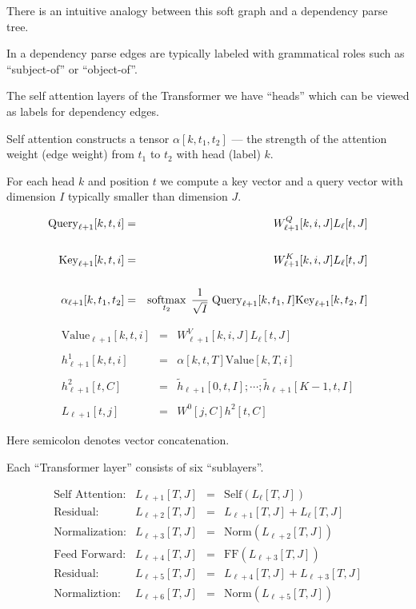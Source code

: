 {\vfill
There is an intuitive analogy between this soft graph and a dependency parse tree.


In a dependency parse edges are typically labeled with grammatical roles such as ``subject-of'' or ``object-of''.

\vfill
The self attention layers of the Transformer we have ``heads'' which can be viewed as labels for dependency edges.

\vfill
Self attention constructs a tensor $\alpha[k,t_1,t_2]$ --- the strength of the attention weight (edge weight)
from $t_1$ to $t_2$ with head (label) $k$.


For each head $k$ and position $t$ we compute a key vector and a query vector with dimension $I$ typically smaller than dimension $J$.

\begin{eqnarray*}
\mathrm{Query}_{\ell+1}[k,t,i] & = & W^Q_{\ell+1}[k,i,J]L_\ell[t,J] \\
\\
\mathrm{Key}_{\ell+1}[k,t,i] & = &  W^K_{\ell+1}[k,i,J]L_\ell[t,J] \\
\\
\alpha_{\ell+1}[k,t_1,t_2] & = & \operatorname*{softmax}_{t_2}\; \frac{1}{\sqrt{I}}\;\mathrm{Query}_{\ell+1}[k,t_1,I]\mathrm{Key}_{\ell+1}[k,t_2,I]
\end{eqnarray*}

      
\begin{eqnarray*}
\mathrm{Value}_{\ell+1}[k,t,i] & = & W^V_{\ell+1}[k,i,J]L_\ell[t,J] \\
\\
h^1_{\ell+1}[k,t,i] & = & \alpha[k,t,T]\mathrm{Value}[k,T,i] \\
\\
h^2_{\ell+1}[t,C] & = & \tilde{h}_{\ell+1}[0,t,I];\cdots;\tilde{h}_{\ell+1}[K-1,t,I] \\
\\
L_{\ell+1}[t,j] & = & W^0[j,C]h^2[t,C]
\end{eqnarray*}

\vfill
Here semicolon denotes vector concatenation.


Each ``Transformer layer'' consists of six ``sublayers''.

$$\begin{array}{rrcl}
\mbox{Self Attention:} &L_{\ell+1}[T,J] & = & \mathrm{Self}(L_\ell[T,J]) \\
\mbox{Residual:} & L_{\ell+2}[T,J] & = & L_{\ell+1}[T,J] + L_\ell[T,J] \\
\mbox{Normalization:} & L_{\ell+3}[T,J] & = & \mathrm{Norm}(L_{\ell+2}[T,J]) \\
\mbox{Feed Forward:} & L_{\ell+4}[T,J] & = &\mathrm{FF}(L_{\ell+3}[T,J]) \\
\mbox{Residual:} & L_{\ell+5}[T,J] & = & L_{\ell+4}[T,J] + L_{\ell+3}[T,J] \\
\mbox{Normaliztion:} & L_{\ell+6}[T,J] & = & \mathrm{Norm}(L_{\ell+5}[T,J])
\end{array}$$

}
